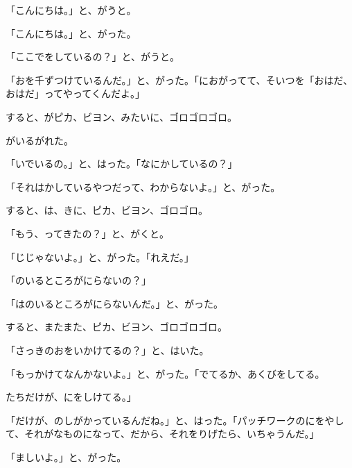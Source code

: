 「こんにちは。」と、がうと。

「こんにちは。」と、がった。

「ここでをしているの？」と、がうと。

「おを千ずつけているんだ。」と、がった。「におがってて、そいつを「おはだ、おはだ」ってやってくんだよ。」

すると、がピカ、ビヨン、みたいに、ゴロゴロゴロ。

がいるがれた。

「いでいるの。」と、はった。「なにかしているの？」

「それはかしているやつだって、わからないよ。」と、がった。

すると、は、きに、ピカ、ビヨン、ゴロゴロ。

「もう、ってきたの？」と、がくと。

「じじゃないよ。」と、がった。「れえだ。」

「のいるところがにらないの？」

「はのいるところがにらないんだ。」と、がった。

すると、またまた、ピカ、ビヨン、ゴロゴロゴロ。

「さっきのおをいかけてるの？」と、はいた。

「もっかけてなんかないよ。」と、がった。「でてるか、あくびをしてる。

たちだけが、にをしけてる。」

「だけが、のしがかっているんだね。」と、はった。「パッチワークのにをやして、それがなものになって、だから、それをりげたら、いちゃうんだ。」

「ましいよ。」と、がった。


